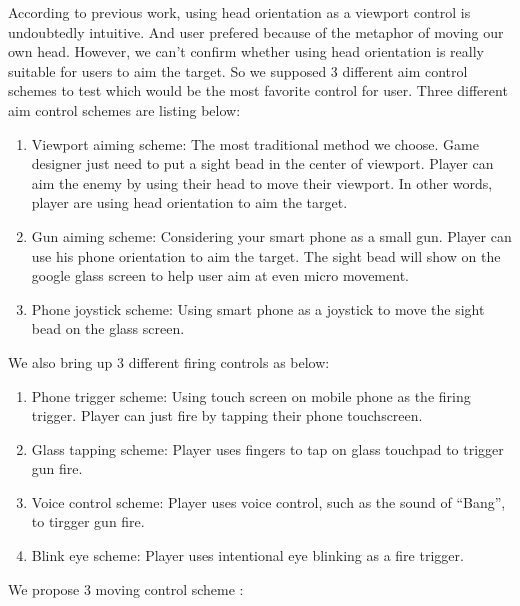\documentclass{sigchi}
\begin{document}
According to previous work\cite{headvideo,tele,robot,viewport}, using head orientation as a viewport control is undoubtedly intuitive. And user prefered because of the metaphor of moving our own head. However, we can't confirm whether using head orientation is really suitable for users to aim the target. 
So we supposed 3 different aim control schemes to test which would be the most favorite control for user. 
Three different aim control schemes are listing below:

\begin{enumerate}
\item Viewport aiming scheme: The most traditional method we choose. Game designer just need to put a sight bead in the center of viewport. Player can aim the enemy by using their head to move their viewport. In other words, player are using head orientation to aim the target.

\item Gun aiming scheme: Considering your smart phone as a small gun. Player can use his phone orientation to aim the target. The sight bead will show on the google glass screen to help user aim at even micro movement.

\item Phone joystick scheme: Using smart phone as a joystick to move the sight bead on the glass screen.
\end{enumerate}

We also bring up 3 different firing controls as below:

\begin{enumerate}
\item Phone trigger scheme: Using touch screen on mobile phone as the firing trigger. Player can just fire by tapping their phone touchscreen.

\item Glass tapping scheme: Player uses fingers to tap on glass touchpad to trigger gun fire.

\item Voice control scheme: Player uses voice control, such as the sound of ``Bang'', to tirgger gun fire.

\item Blink eye scheme: Player uses intentional eye blinking as a fire trigger.
\end{enumerate}

We propose 3 moving control scheme :
\end{document}
